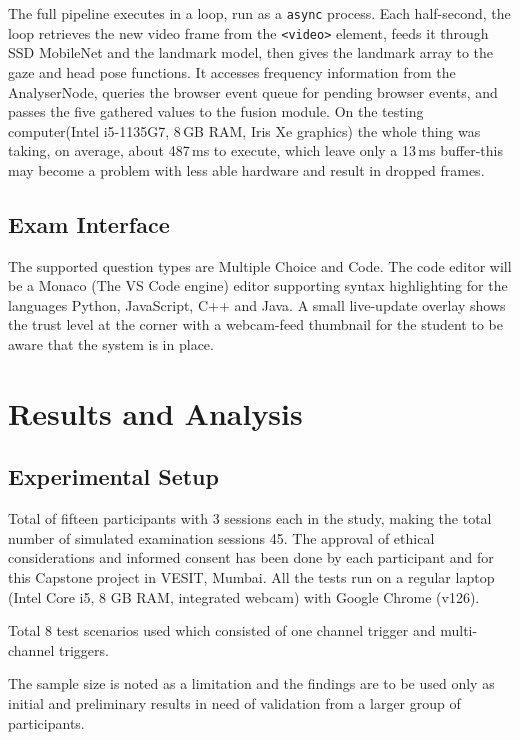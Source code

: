 \documentclass[runningheads]{llncs}
\begin{document}
The full pipeline executes in a loop, run as a \texttt{async} process. Each half-second, the loop retrieves the new video frame from the \texttt{<video>} element, feeds it through SSD MobileNet and the landmark model, then gives the landmark array to the gaze and head pose functions. It accesses frequency information from the AnalyserNode, queries the browser event queue for pending browser events, and passes the five gathered values to the fusion module. On the testing computer(Intel i5-1135G7, 8\,GB RAM, Iris Xe graphics) the whole thing was taking, on average, about 487\,ms to execute, which leave only a 13\,ms buffer-this may become a problem with less able hardware and result in dropped frames.

\subsection{Exam Interface}

The supported question types are Multiple Choice and Code. The code editor will be a Monaco (The VS Code engine) editor supporting syntax highlighting for the languages Python, JavaScript, C++ and Java. A small live-update overlay shows the trust level at the corner with a webcam-feed thumbnail for the student to be aware that the system is in place.

\section{Results and Analysis}\label{sec:results}

\subsection{Experimental Setup}

Total of fifteen participants with 3 sessions each in the study, making the total number of simulated examination sessions 45. The approval of ethical considerations and informed consent has been done by each participant and for this Capstone project in VESIT, Mumbai. All the tests run on a regular laptop (Intel Core i5, 8 GB RAM, integrated webcam) with Google Chrome (v126).

Total 8 test scenarios used which consisted of one channel trigger and multi-channel triggers.

The sample size is noted as a limitation and the findings are to be used only as initial and preliminary results in need of validation from a larger group of participants.
\end{document}

